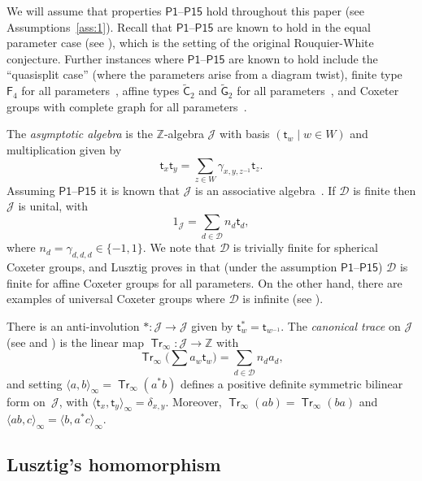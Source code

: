 \documentclass[11pt]{article}
\theoremstyle{plain}
\theoremstyle{definition}
\numberwithin{equation}{section}
\def\sC{\mathsf{C}}
\def\sF{\mathsf{F}}
\def\sG{\mathsf{G}}
\def\cD{\mathcal{D}}
\def\cJ{\mathcal{J}}
\def\ZZ{\mathbb{Z}}
\DeclareMathOperator\Tr{\mathsf{Tr}}
\newcommand{\st}{\mathsf{t}}
\begin{document}
We will assume that properties $\mathsf{P1}$--$\mathsf{P15}$ hold throughout this paper (see Assumptions~\ref{ass:1}). Recall that $\mathsf{P1}$--$\mathsf{P15}$ are known to hold in the equal parameter case (see \cite[Section 15]{Lus:03}), which is the setting of the original Rouquier-White conjecture. Further instances where $\mathsf{P1}$--$\mathsf{P15}$ are known to hold include the ``quasisplit case'' \cite[Section 16]{Lus:03} (where the parameters arise from a diagram twist), finite type $\sF_4$ for all parameters~\cite{Geck:11}, affine types $\tilde{\sC}_2$ and $\tilde{\sG}_2$ for all parameters~\cite{GP:19,GP:19b}, and Coxeter groups with complete graph for all parameters~\cite{Xie:21}. 



The \textit{asymptotic algebra} is the $\ZZ$-algebra $\cJ$ with basis $(\st_w\mid w\in W)$ and multiplication given by 
$$
\st_x\st_y=\sum_{z\in W}\gamma_{x,y,z^{-1}}\st_z. 
$$
Assuming $\mathsf{P1}$--$\mathsf{P15}$ it is known that $\cJ$ is an associative algebra~\cite[Section 18.3]{Lus:03}. If $\cD$ is finite then $\cJ$ is unital, with 
$$
1_{\cJ}=\sum_{d\in \cD}n_d\st_d,
$$
where $n_d=\gamma_{d,d,d}\in\{-1,1\}$. We note that $\cD$ is trivially finite for spherical Coxeter groups, and Lusztig proves in \cite[Theorem 18.2]{Lus:03} that (under the assumption $\mathsf{P1}$--$\mathsf{P15}$) $\cD$ is finite for affine Coxeter groups for all parameters. On the other hand, there are examples of universal Coxeter groups where $\cD$ is infinite (see \cite[Remark~4.5]{SY:15}). 

There is an anti-involution $*:\cJ\to\cJ$ given by $\st_w^*=\st_{w^{-1}}$. The \textit{canonical trace} on $\cJ$ (see \cite[Section 20.1]{Lus:03} and \cite[Section~5.1]{CGLP:24}) is the linear map $\Tr_{\infty}:\cJ\to\ZZ$ with 
$$
\Tr_{\infty}\big(\sum a_w\st_w\big)=\sum_{d\in\cD}n_da_d,
$$
and setting $\langle a,b\rangle_{\infty}=\Tr_{\infty}(a^*b)$ defines a positive definite symmetric bilinear form on~$\cJ$, with $\langle \st_x,\st_y\rangle_{\infty}=\delta_{x,y}$. Moreover, $\Tr_{\infty}(ab)=\Tr_{\infty}(ba)$ and $\langle ab,c\rangle_{\infty}=\langle b,a^*c\rangle_{\infty}$. 


\subsection{Lusztig's homomorphism}\label{sec:LusHom}
\end{document}
